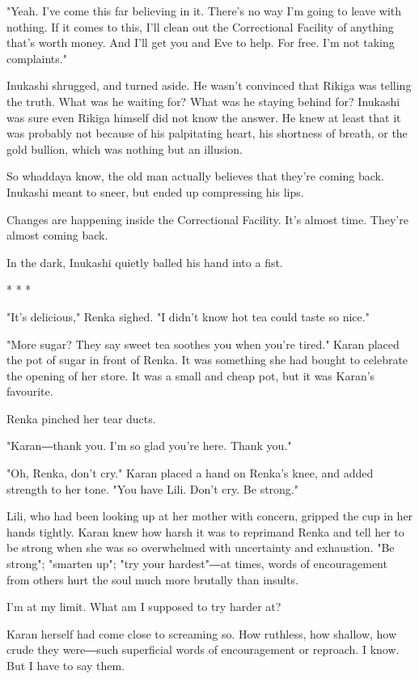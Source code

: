 "Yeah. I've come this far believing in it. There's no way I'm going to
leave with nothing. If it comes to this, I'll clean out the Correctional
Facility of anything that's worth money. And I'll get you and Eve to
help. For free. I'm not taking complaints."

Inukashi shrugged, and turned aside. He wasn't convinced that Rikiga was
telling the truth. What was he waiting for? What was he staying behind
for? Inukashi was sure even Rikiga himself did not know the answer. He
knew at least that it was probably not because of his palpitating heart,
his shortness of breath, or the gold bullion, which was nothing but an
illusion.

So whaddaya know, the old man actually believes that they're coming
back. Inukashi meant to sneer, but ended up compressing his lips.

Changes are happening inside the Correctional Facility. It's almost
time. They're almost coming back.

In the dark, Inukashi quietly balled his hand into a fist.

* * *

"It's delicious," Renka sighed. "I didn't know hot tea could taste so
nice."

"More sugar? They say sweet tea soothes you when you're tired." Karan
placed the pot of sugar in front of Renka. It was something she had
bought to celebrate the opening of her store. It was a small and cheap
pot, but it was Karan's favourite.

Renka pinched her tear ducts.

"Karan―thank you. I'm so glad you're here. Thank you."

"Oh, Renka, don't cry." Karan placed a hand on Renka's knee, and added
strength to her tone. "You have Lili. Don't cry. Be strong."

Lili, who had been looking up at her mother with concern, gripped the
cup in her hands tightly. Karan knew how harsh it was to reprimand Renka
and tell her to be strong when she was so overwhelmed with uncertainty
and exhaustion. "Be strong"; "smarten up"; "try your hardest"―at times,
words of encouragement from others hurt the soul much more brutally than
insults.

I'm at my limit. What am I supposed to try harder at?

Karan herself had come close to screaming so. How ruthless, how shallow,
how crude they were―such superficial words of encouragement or reproach.
I know. But I have to say them.

